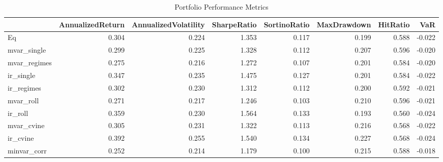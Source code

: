 \begin{table}

\caption{Portfolio Performance Metrics}
\centering
\begin{tabular}[t]{lrrrrrrr}
\toprule
  & AnnualizedReturn & AnnualizedVolatility & SharpeRatio & SortinoRatio & MaxDrawdown & HitRatio & VaR\\
\midrule
Eq & 0.304 & 0.224 & 1.353 & 0.117 & 0.199 & 0.588 & -0.022\\
mvar\_single & 0.299 & 0.225 & 1.328 & 0.112 & 0.207 & 0.596 & -0.020\\
mvar\_regimes & 0.275 & 0.216 & 1.272 & 0.107 & 0.201 & 0.584 & -0.020\\
ir\_single & 0.347 & 0.235 & 1.475 & 0.127 & 0.201 & 0.584 & -0.022\\
ir\_regimes & 0.302 & 0.230 & 1.312 & 0.112 & 0.200 & 0.592 & -0.021\\
\addlinespace
mvar\_roll & 0.271 & 0.217 & 1.246 & 0.103 & 0.210 & 0.596 & -0.021\\
ir\_roll & 0.359 & 0.230 & 1.564 & 0.133 & 0.193 & 0.560 & -0.024\\
mvar\_cvine & 0.305 & 0.231 & 1.322 & 0.113 & 0.216 & 0.568 & -0.022\\
ir\_cvine & 0.392 & 0.255 & 1.540 & 0.134 & 0.227 & 0.568 & -0.024\\
minvar\_corr & 0.252 & 0.214 & 1.179 & 0.100 & 0.215 & 0.588 & -0.018\\
\bottomrule
\end{tabular}
\end{table}
